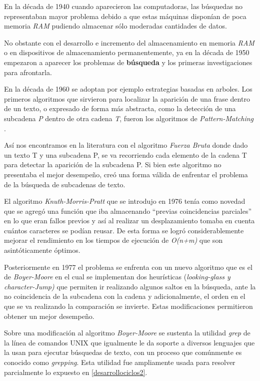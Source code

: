 \documentclass[
  10,
  openany]{book}
\begin{document}
En la década de 1940 cuando aparecieron las computadoras, las búsquedas no representaban mayor problema debido a que estas máquinas disponían de poca memoria \emph{RAM} pudiendo almacenar sólo moderadas cantidades de datos.

No obstante con el desarrollo e incremento del almacenamiento en memoria \emph{RAM} o en dispositivos de almacenamiento permanentemente, ya en la década de 1950 empezaron a aparecer los problemas de \textbf{búsqueda} y los primeras investigaciones para afrontarla.

En la década de 1960 se adoptan por ejemplo estrategias basadas en arboles. Los primeros algoritmos que sirvieron para localizar la aparición de una frase dentro de un texto, o expresado de forma más abstracta, como la detección de una subcadena \emph{P} dentro de otra cadena \emph{T}, fueron los algoritmos de \emph{Pattern-Matching} \citep{goodrich2013}.

Así nos encontramos en la literatura con el algoritmo \emph{Fuerza Bruta} donde dado un texto T y una subcadena P, se va recorriendo cada elemento de la cadena T para detectar la aparición de la subcadena P. Si bien este algoritmo no presentaba el mejor desempeño, creó una forma válida de enfrentar el problema de la búsqueda de subcadenas de texto.

El algoritmo \emph{Knuth-Morris-Pratt} que se introdujo en 1976 tenía como novedad que se agregó una función que iba almacenando ``previas coincidencias parciales'' en lo que eran fallos previos y así al realizar un desplazamiento tomaba en cuenta cuántos caracteres se podían reusar. De esta forma se logró considerablemente mejorar el rendimiento en los tiempos de ejecución de \emph{O(n+m)} que son asintóticamente óptimos.

Posteriormente en 1977 el problema se enfrenta con un nuevo algoritmo que es el de \emph{Boyer-Moore} en el cual se implementan dos heurísticas (\emph{looking-glass y} \emph{character-Jump)} que permiten ir realizando algunos saltos en la búsqueda, ante la no coincidencia de la subcadena con la cadena y adicionalmente, el orden en el que se va realizando la comparación se invierte. Estas modificaciones permitieron obtener un mejor desempeño.

Sobre una modificación al algoritmo \emph{Boyer-Moore} se sustenta la utilidad \emph{grep} de la línea de comandos UNIX que igualmente le da soporte a diversos lenguajes que la usan para ejecutar búsquedas de texto, con un proceso que comúnmente es conocido como \emph{grepping}. Esta utilidad fue ampliamente usada para resolver parcialmente lo expuesto en \ref{desarrollociclos2}.
\end{document}
